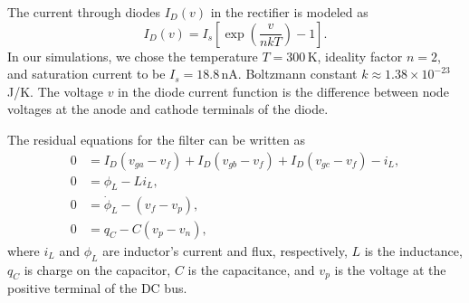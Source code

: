 \documentclass[10pt]{ijnam}
\theoremstyle{definition}
\begin{document}
The current through diodes $I_D(v)$ in the rectifier is modeled as
\begin{equation*}
    I_D(v) = I_s \left[\exp\left(\frac{v}{nkT}\right) - 1 \right].
\end{equation*} 
In our simulations, we chose the temperature $T=300\,$K, ideality factor $n=2$, 
and saturation current to be $I_s = 18.8\,$nA. Boltzmann constant 
$k \approx 1.38 \times 10^{-23}$ J/K. The voltage $v$ in the
diode current function is the difference between node voltages at the anode
and cathode terminals of the diode.

The residual equations for the filter can be written as
\begin{align}
    0 &= I_D(v_{ga} - v_f) + I_D(v_{gb} - v_f) + I_D(v_{gc} - v_f) - i_L, \\
    0 &= \phi_L - L i_L,                                                  \\  
    0 &= \dot \phi_L - (v_f - v_p),                                       \\
    0 &= q_C - C(v_p - v_n),
\end{align}
where $i_L$ and $\phi_L$ are inductor's current and flux, respectively, 
$L$ is the inductance, $q_C$ is charge on the capacitor, $C$ is the 
capacitance, and $v_p$ is the voltage at the positive terminal of the DC bus.
\end{document}
